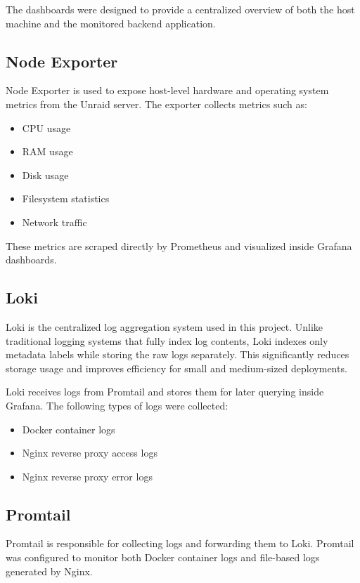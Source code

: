 \documentclass[11pt,a4paper]{article}
\begin{document}
The dashboards were designed to provide a centralized overview of both the host machine and the monitored backend application.

\subsection{Node Exporter}

Node Exporter is used to expose host-level hardware and operating system metrics from the Unraid server. The exporter collects metrics such as:

\begin{itemize}
    \item CPU usage
    \item RAM usage
    \item Disk usage
    \item Filesystem statistics
    \item Network traffic
\end{itemize}

These metrics are scraped directly by Prometheus and visualized inside Grafana dashboards.

\subsection{Loki}

Loki is the centralized log aggregation system used in this project. Unlike traditional logging systems that fully index log contents, 
Loki indexes only metadata labels while storing the raw logs separately. This significantly reduces storage usage and improves 
efficiency for small and medium-sized deployments.

Loki receives logs from Promtail and stores them for later querying inside Grafana. The following types of logs were collected:

\begin{itemize}
    \item Docker container logs
    \item Nginx reverse proxy access logs
    \item Nginx reverse proxy error logs
\end{itemize}

\subsection{Promtail}

Promtail is responsible for collecting logs and forwarding them to Loki. Promtail was configured to monitor both Docker container 
logs and file-based logs generated by Nginx.
\end{document}

